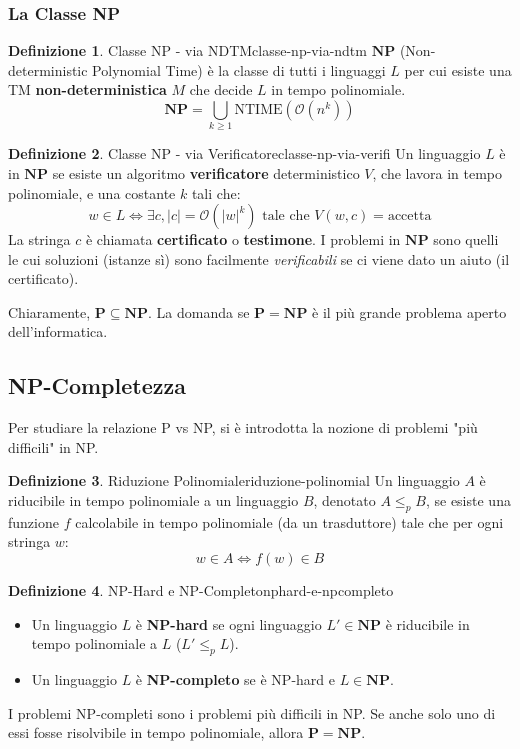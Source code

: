 \documentclass[a4paper]{article}
\theoremstyle{definition} %
\newtheorem{definition}{Definizione}
\newcommand{\bigO}[1]{\mathcal{O}(#1)}
\newcommand{\reducep}{\le_p}
\begin{document}
\subsubsection{La Classe NP}
\begin{definition}{Classe NP - via NDTM}{classe-np-via-ndtm}
$\mathbf{NP}$ (Non-deterministic Polynomial Time) è la classe di tutti i linguaggi $L$ per cui esiste una TM \textbf{non-deterministica} $M$ che decide $L$ in tempo polinomiale.
$$ \mathbf{NP} = \bigcup_{k \ge 1} \text{NTIME}(\bigO{n^k}) $$
\end{definition}
\begin{definition}{Classe NP - via Verificatore}{classe-np-via-verifi}
Un linguaggio $L$ è in $\mathbf{NP}$ se esiste un algoritmo \textbf{verificatore} deterministico $V$, che lavora in tempo polinomiale, e una costante $k$ tali che:
$$ w \in L \iff \exists c, |c| = \bigO{|w|^k} \text{ tale che } V(w, c) = \text{accetta} $$
La stringa $c$ è chiamata \textbf{certificato} o \textbf{testimone}. I problemi in $\mathbf{NP}$ sono quelli le cui soluzioni (istanze sì) sono facilmente \emph{verificabili} se ci viene dato un aiuto (il certificato).
\end{definition}
Chiaramente, $\mathbf{P} \subseteq \mathbf{NP}$. La domanda se $\mathbf{P} = \mathbf{NP}$ è il più grande problema aperto dell'informatica.

\subsection{NP-Completezza}
Per studiare la relazione P vs NP, si è introdotta la nozione di problemi "più difficili" in NP.
\begin{definition}{Riduzione Polinomiale}{riduzione-polinomial}
Un linguaggio $A$ è riducibile in tempo polinomiale a un linguaggio $B$, denotato $A \reducep B$, se esiste una funzione $f$ calcolabile in tempo polinomiale (da un trasduttore) tale che per ogni stringa $w$:
$$ w \in A \iff f(w) \in B $$
\end{definition}
\begin{definition}{NP-Hard e NP-Completo}{nphard-e-npcompleto}
\begin{itemize}
    \item Un linguaggio $L$ è \textbf{NP-hard} se ogni linguaggio $L' \in \mathbf{NP}$ è riducibile in tempo polinomiale a $L$ ($L' \reducep L$).
    \item Un linguaggio $L$ è \textbf{NP-completo} se è NP-hard e $L \in \mathbf{NP}$.
\end{itemize}
\end{definition}
I problemi NP-completi sono i problemi più difficili in NP. Se anche solo uno di essi fosse risolvibile in tempo polinomiale, allora $\mathbf{P} = \mathbf{NP}$.
\end{document}
